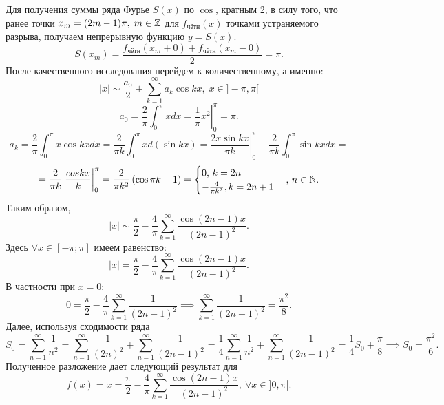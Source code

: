 \documentclass[../../main.tex]{subfiles}
\begin{document}
\begin{examples}
\begin{enumerate}
				Для получения суммы ряда Фурье $S(x)$ по $\cos$, кратным 2, в силу того, что ранее точки $x_m = (2m -1)\pi, \; m \in \mathbb{Z}$ для $f_{\text{чётн}}(x)$ точками устраняемого разрыва, получаем непрерывную функцию $y = S(x).$
				\[
					S(x_m) = \frac{f_{\text{чётн}}(x_m+0)+ f_{\text{чётн}}(x_m-0)}{2} = \pi.
				\]
				После качественного исследования перейдем к количественному, а именно:
				\[
					|x| \sim \frac{a_0}{2} + \sum_{k=1}^{\infty}  a_k \cos k x, \; x \in ]-\pi, \pi[
				\]
				\[
					a_0 = \frac{2}{\pi} \int_{0}^{\pi}xdx = \left. \frac{1}{\pi} x^2 \right|_0^{\pi} = \pi.
				\]
				\[
					a_k = \frac{2}{\pi} \int_{0}^{\pi}x \cos kx dx = 
					\frac{2}{\pi k } \int_{0}^{\pi}x d (\sin kx) = 
					\left. \frac{2x \sin kx}{\pi k}\right|_0^{\pi} - \frac{2}{\pi k} \int_{0}^{\pi}\sin kx dx =  
				\]
				\[
				 = \frac{2}{\pi k} \left. \frac{cos k x}{k} \right|_0^{\pi} =
				 \frac{2}{\pi k^2} \left( \cos \pi k - 1 \right) = 
				 \begin{cases}
				 0, \, k = 2n \\
				 -\frac{4}{\pi k^2}, k = 2n+1
				 \end{cases}, \, n \in \mathbb{N}.
				\]
				Таким образом,
				\[
					|x| \sim \frac{\pi}{2} - \frac{4}{\pi} \sum_{k=1}^{\infty}\frac{\cos(2n-1)x}{(2n-1)^2}.
				\]
				Здесь $\forall x \in [-\pi; \pi]$ имеем равенство:
				\[
					|x| = \frac{\pi}{2} - \frac{4}{\pi} \sum_{k=1}^{\infty}\frac{\cos(2n-1)x}{(2n-1)^2}.
				\]
				В частности при $x = 0:$
				\[
					0 = \frac{\pi}{2} - \frac{4}{\pi} \sum_{k=1}^{\infty}\frac{1}{(2n-1)^2} \implies  \sum_{k=1}^{\infty}\frac{1}{(2n-1)^2} = \frac{\pi^2}{8}.
				\]
				Далее, используя сходимости ряда
				\[
					S_0 = \sum_{n=1}^{\infty} \frac{1}{n^2} = \sum_{n=1}^{\infty} \frac{1}{(2n)^2}  + \sum_{n=1}^{\infty} \frac{1}{(2n-1)^2} = 
					\frac{1}{4} \sum_{n=1}^{\infty} \frac{1}{n^2} +  \sum_{n=1}^{\infty} \frac{1}{(2n-1)^2} =
					\frac{1}{4}S_0 + \frac{\pi}{8} \implies S_0 = \frac{\pi^2}{6}.
				\]
				Полученное разложение дает следующий результат для 
				\[
					f(x) = x = \frac{\pi}{2} - \frac{4}{\pi} \sum_{k=1}^{\infty}\frac{\cos(2n-1)x}{(2n-1)^2}, \ \forall x \in ]0, \pi[.
				\]
			\end{enumerate}
		\end{examples}
\end{document}
